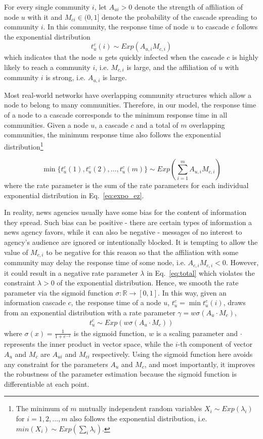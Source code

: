 For every single community $i$, let $A_{ui} > 0$ denote the strength of affiliation of node $u$ with it and $M_{ci} \in (0,1]$ denote the probability of the cascade spreading to community $i$. In this community, the response time of node $u$ to cascade $c$ follows the exponential distribution
\begin{equation} \label{eq:expo_ez}
t_u^c(i) \sim Exp(A_{u,i} M_{c,i})
\end{equation}
which indicates that the node $u$ gets quickly infected when the cascade $c$ is highly likely to reach a community $i$, i.e. $M_{c,i}$ is large, and the affiliation of $u$ with community $i$ is strong, i.e. $A_{u,i}$ is large.

Most real-world networks have overlapping community structures which allow a node to belong to many communities. Therefore, in our model, the response time of a node to a cascade corresponds to the minimum response time in all communities. Given a node $u$, a cascade $c$ and a total of $m$ overlapping communities, the minimum response time also follows the exponential distribution\footnote{The minimum of $m$ mutually independent random variables $X_i \sim Exp(\lambda_i)$ for $i=1,2,\dots,m$ also follows the exponential distribution, i.e. $min(X_i) \sim Exp(\sum_i\lambda_i)$.} 

\begin{equation} \label{eq:total}
\min \{ t_u^c(1),t_u^c(2),\dots, t_u^c(m) \} \sim  Exp(\sum_{i=1}^{m} A_{u,i} M_{c,i} ) 
\end{equation}
where the rate parameter is the sum of the rate parameters for each individual exponential distribution in Eq.~\ref{eq:expo_ez}.

In reality, news agencies usually have some bias for the content of information they spread. Such bias can be positive - there are certain types of information a news agency favors, while it can also be negative - messages of no interest to agency's audience are ignored or intentionally blocked. It is tempting to allow the value of $M_{c,i}$ to be negative for this reason so that the affiliation with some community may delay the response time of some node, i.e. $A_{c,i} M_{c,i} < 0$. However, it could result in a negative rate parameter $\lambda$ in Eq.~\ref{eq:total} which violates the constraint $\lambda > 0$ of the exponential distribution. Hence, we smooth the rate parameter via the sigmoid function $\sigma : \mathbb{R} \to [0,1]$. In this way, given an information cascade $c$, the response time of a node $u$, $t_u^c = \min  t_u^c(i)$, draws from an exponential distribution with a rate parameter $\gamma = w \sigma( A_u \cdot M_c)$,
\begin{align} \label{eq:sigmoid}
t_u^c \sim Exp(w \sigma(A_u \cdot M_c))
\end{align}
where $\sigma(x)= \frac{1}{1+e^{-x}}$ is the sigmoid function, $w$ is a scaling parameter and $\cdot$ represents the inner product in vector space, while the $i$-th component of vector $A_u$ and $M_c$ are  $A_{ui}$ and $M_{ci}$ respectively. Using the sigmoid function here avoids any constraint for the parameters $A_u$ and $M_c$, and most importantly, it improves the robustness of the parameter estimation because the sigmoid function is differentiable at each point. 

